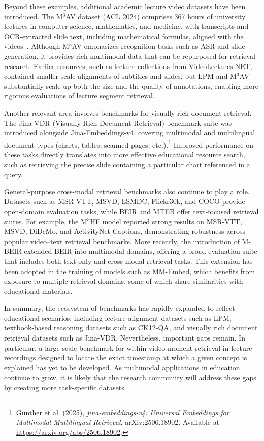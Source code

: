 Beyond these examples, additional academic lecture video datasets have been introduced. The M\(^3\)AV dataset (ACL 2024) comprises 367 hours of university lectures in computer science, mathematics, and medicine, with transcripts and OCR-extracted slide text, including mathematical formulas, aligned with the videos~\cite{chen2024m3av}. Although M\(^3\)AV emphasizes recognition tasks such as ASR and slide generation, it provides rich multimodal data that can be repurposed for retrieval research. Earlier resources, such as lecture collections from VideoLectures.NET, contained smaller-scale alignments of subtitles and slides, but LPM and M\(^3\)AV substantially scale up both the size and the quality of annotations, enabling more rigorous evaluations of lecture segment retrieval.

Another relevant area involves benchmarks for visually rich document retrieval. The Jina-VDR (Visually Rich Document Retrieval) benchmark suite was introduced alongside Jina-Embeddings-v4, covering multimodal and multilingual document types (charts, tables, scanned pages, etc.).\footnote{Günther et al. (2025), \emph{jina-embeddings-v4: Universal Embeddings for Multimodal Multilingual Retrieval}, arXiv:2506.18902. Available at \url{https://arxiv.org/abs/2506.18902}.} Improved performance on these tasks directly translates into more effective educational resource search, such as retrieving the precise slide containing a particular chart referenced in a query.

General-purpose cross-modal retrieval benchmarks also continue to play a role. Datasets such as MSR-VTT, MSVD, LSMDC, Flickr30k, and COCO provide open-domain evaluation tasks, while BEIR and MTEB offer text-focused retrieval suites. For example, the M\(^3\)HF model reported strong results on MSR-VTT, MSVD, DiDeMo, and ActivityNet Captions, demonstrating robustness across popular video–text retrieval benchmarks. More recently, the introduction of M-BEIR extended BEIR into multimodal domains, offering a broad evaluation suite that includes both text-only and cross-modal retrieval tasks. This extension has been adopted in the training of models such as MM-Embed, which benefits from exposure to multiple retrieval domains, some of which share similarities with educational materials.

In summary, the ecosystem of benchmarks has rapidly expanded to reflect educational scenarios, including lecture alignment datasets such as LPM, textbook-based reasoning datasets such as CK12-QA, and visually rich document retrieval datasets such as Jina-VDR. Nevertheless, important gaps remain. In particular, a large-scale benchmark for within-video moment retrieval in lecture recordings designed to locate the exact timestamp at which a given concept is explained has yet to be developed. As multimodal applications in education continue to grow, it is likely that the research community will address these gaps by creating more task-specific datasets.


